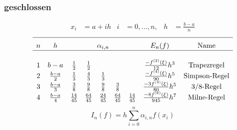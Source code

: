 \documentclass[
ngerman,
accentcolor=9c,%
type=intern,
marginpar=false
]{tudapub}
\begin{document}
            \subsubsection{geschlossen}
                \begin{align*}
                    x_i &= a+ih &  i&=0,\dots,n, &  h&=\frac{b-a}{n}
                \end{align*}
                \begin{equation*}
                    \begin{array}{c c c c c c c c c}
                        \hline\\[-.5\normalbaselineskip]
                        n & h & \multicolumn{5}{c}{\alpha_{i,n}}& E_n(f) & \text{Name}\\
                        \hline\\
                        1 & b-a & \frac{1}{2} & \frac{1}{2} & & & & \frac{-f^{(2)}(\xi)}{12}h^3 & \text{Trapezregel}\\
                        2 & \frac{b-a}{2} & \frac{1}{3} & \frac{4}{3} & \frac{1}{3} & & & \frac{-f^{(4)}(\xi)}{90}h^5 & \text{Simpson-Regel}\\
                        3 & \frac{b-a}{3} & \frac{3}{8} & \frac{9}{8} & \frac{9}{8} & \frac{3}{8} & & \frac{-3f^{(4)}(\xi)}{80}h^5 & \text{3/8-Regel}\\
                        4 & \frac{b-a}{4} & \frac{14}{45} & \frac{64}{45} & \frac{24}{45} & \frac{64}{45} & \frac{14}{45} & \frac{-8f^{(6)}(\xi)}{945}h^7 & \text{Milne-Regel}\\
                    \end{array}
                \end{equation*}
                \begin{equation*}
                    I_n(f) = h \sum^n_{i=0} \alpha_{i,n} f(x_i)
                \end{equation*}
\end{document}
